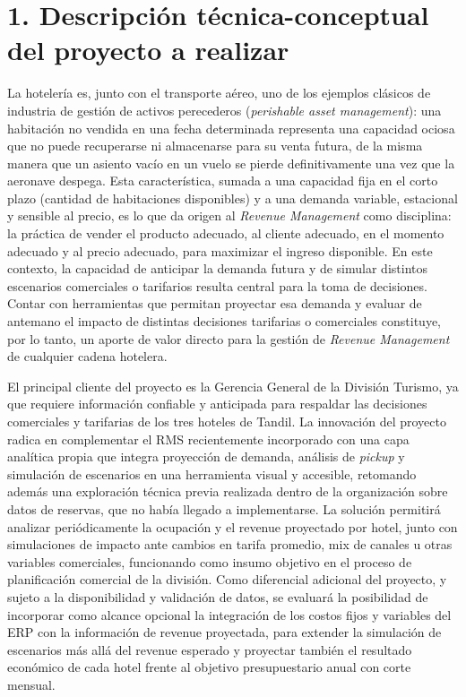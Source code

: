 \documentclass[
11pt, %
]{charter}
\begin{document}
\section{1. Descripción técnica-conceptual del proyecto a realizar}
\label{sec:descripcion}

La hotelería es, junto con el transporte aéreo, uno de los ejemplos clásicos de industria de gestión de activos perecederos (\textit{perishable asset management}): una habitación no vendida en una fecha determinada representa una capacidad ociosa que no puede recuperarse ni almacenarse para su venta futura, de la misma manera que un asiento vacío en un vuelo se pierde definitivamente una vez que la aeronave despega. Esta característica, sumada a una capacidad fija en el corto plazo (cantidad de habitaciones disponibles) y a una demanda variable, estacional y sensible al precio, es lo que da origen al \textit{Revenue Management} como disciplina: la práctica de vender el producto adecuado, al cliente adecuado, en el momento adecuado y al precio adecuado, para maximizar el ingreso disponible. En este contexto, la capacidad de anticipar la demanda futura y de simular distintos escenarios comerciales o tarifarios resulta central para la toma de decisiones. Contar con herramientas que permitan proyectar esa demanda y evaluar de antemano el impacto de distintas decisiones tarifarias o comerciales constituye, por lo tanto, un aporte de valor directo para la gestión de \textit{Revenue Management} de cualquier cadena hotelera.

El principal cliente del proyecto es la Gerencia General de la División Turismo, ya que requiere información confiable y anticipada para respaldar las decisiones comerciales y tarifarias de los tres hoteles de Tandil. La innovación del proyecto radica en complementar el RMS recientemente incorporado con una capa analítica propia que integra proyección de demanda, análisis de \textit{pickup} y simulación de escenarios en una herramienta visual y accesible, retomando además una exploración técnica previa realizada dentro de la organización sobre datos de reservas, que no había llegado a implementarse. La solución permitirá analizar periódicamente la ocupación y el revenue proyectado por hotel, junto con simulaciones de impacto ante cambios en tarifa promedio, mix de canales u otras variables comerciales, funcionando como insumo objetivo en el proceso de planificación comercial de la división. Como diferencial adicional del proyecto, y sujeto a la disponibilidad y validación de datos, se evaluará la posibilidad de incorporar como alcance opcional la integración de los costos fijos y variables del ERP con la información de revenue proyectada, para extender la simulación de escenarios más allá del revenue esperado y proyectar también el resultado económico de cada hotel frente al objetivo presupuestario anual con corte mensual.
\end{document}
